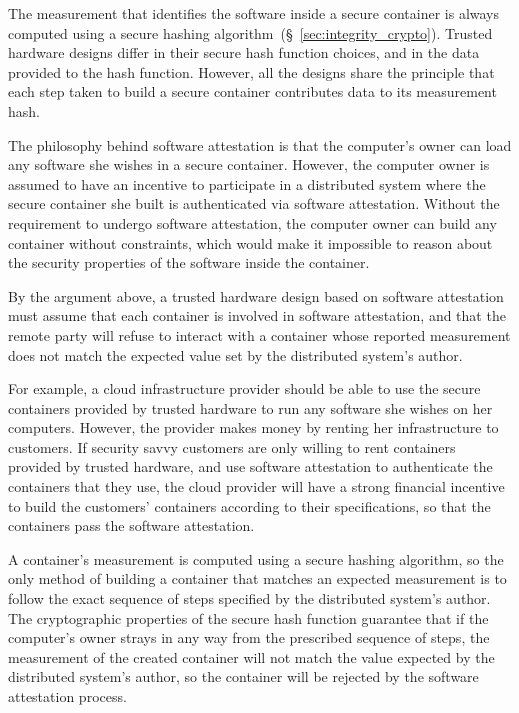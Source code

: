 \label{sec:generic_measurement}

The measurement that identifies the software inside a secure container is
always computed using a secure hashing
algorithm~(\S~\ref{sec:integrity_crypto}). Trusted hardware designs differ in
their secure hash function choices, and in the data provided to the hash
function. However, all the designs share the principle that each step taken to
build a secure container contributes data to its measurement hash.

The philosophy behind software attestation is that the computer's owner can
load any software she wishes in a secure container. However, the computer owner
is assumed to have an incentive to participate in a distributed system where
the secure container she built is authenticated via software attestation.
Without the requirement to undergo software attestation, the computer owner can
build any container without constraints, which would make it impossible to
reason about the security properties of the software inside the container.

By the argument above, a trusted hardware design based on software attestation
must assume that each container is involved in software attestation, and that
the remote party will refuse to interact with a container whose reported
measurement does not match the expected value set by the distributed system's
author.

For example, a cloud infrastructure provider should be able to use the secure
containers provided by trusted hardware to run any software she wishes on her
computers. However, the provider makes money by renting her infrastructure to
customers. If security savvy customers are only willing to rent containers
provided by trusted hardware, and use software attestation to authenticate the
containers that they use, the cloud provider will have a strong financial
incentive to build the customers' containers according to their specifications,
so that the containers pass the software attestation.

A container's measurement is computed using a secure hashing algorithm, so the
only method of building a container that matches an expected measurement is to
follow the exact sequence of steps specified by the distributed system's
author. The cryptographic properties of the secure hash function guarantee that
if the computer's owner strays in any way from the prescribed sequence of
steps, the measurement of the created container will not match the value
expected by the distributed system's author, so the container will be rejected
by the software attestation process.

